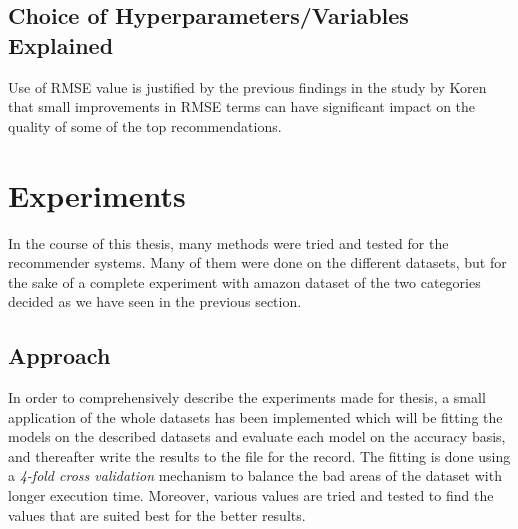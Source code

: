 \subsection{Choice of Hyperparameters/Variables Explained}

Use of RMSE value is justified by the previous findings in the study by Koren \cite{Koren2010} \cite{Koren2008} that small improvements in RMSE terms can have significant impact on the quality of some of the top recommendations.

\section{Experiments}
In the course of this thesis, many methods were tried and tested for the recommender systems. Many of them were done on the different datasets, but for the sake of a complete experiment with amazon dataset of the two categories decided as we have seen in the previous section.

\subsection{Approach}
In order to comprehensively describe the experiments made for thesis, a small application of the whole datasets has been implemented which will be fitting the models on the described datasets and evaluate each model on the accuracy basis, and thereafter write the results to the file for the record. The fitting is done using a \textit{4-fold cross validation} mechanism to balance the bad areas of the dataset with longer execution time. Moreover, various values are tried and tested to find the values that are suited best for the better results. 


\begin{figure}
  {\par}
\end{figure}



